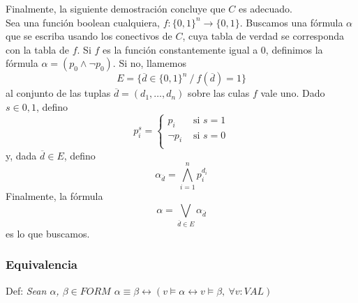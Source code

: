 \documentclass[14pt,a4paper,fleqn]{article}
\newcommand{\entonces}{\rightarrow}
\newcommand{\satisface}{\vDash}
\newcommand{\sii}{\leftrightarrow}
\begin{document}
Finalmente, la siguiente demostración concluye que $C$ es adecuado.\\
Sea una función boolean cualquiera, $f: \{0,1\}^n \entonces \{0,1\}$. Buscamos una fórmula $\alpha$ que se escriba usando los conectivos de $C$, cuya tabla de verdad se corresponda con la tabla de $f$. Si $f$ es la función constantemente igual a 0, definimos la fórmula $\alpha= ( p_{0} \wedge \neg p_{0} )$. Si no, llamemos
\begin{equation*}
	E = \{ \overline{d} \in \{0,1\}^n \: / \: f(\overline{d}) = 1 \}
\end{equation*}
al conjunto de las tuplas $ \overline{d} = (d_{1}, \dotsc, d_{n})$ sobre las culas $f$ vale uno. Dado $s \in {0,1}$, defino 
\[
	p_{i}^{s}	= 
	\left \{
	\begin{array}{rl}
		p_{i} & \text{ si } s=1 \\
		\neg p_{i} & \text{ si } s=0 \\		
	\end{array}
	\right.
\]
y, dada $\overline{d} \in E$, defino
\begin{equation*}
	\alpha_{\overline{d}} = \bigwedge_{i=1}^{n} p_{i}^{d_{i}}
\end{equation*}
Finalmente, la fórmula
\begin{equation*}
	\alpha = \bigvee_{\overline{d} \in E} \alpha_{\overline{d}}
\end{equation*}
es lo que buscamos.

\subsubsection*{Equivalencia}
Def: \emph{Sean $\alpha$, $\beta \in FORM$ $\alpha \equiv \beta \sii (v \satisface \alpha \sii v \satisface \beta ,\: \forall v: VAL)$}
\end{document}
